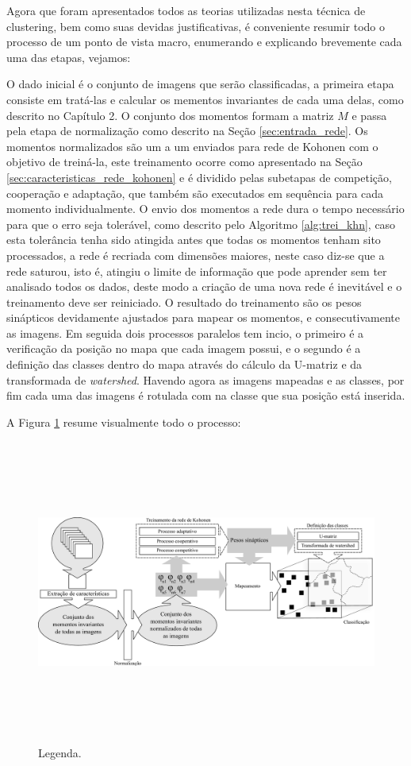 Agora que foram apresentados todos as teorias utilizadas nesta técnica de
clustering, bem como suas devidas justificativas, é conveniente resumir todo o
processo de um ponto de vista macro, enumerando e explicando brevemente cada uma
das etapas, vejamos:

O dado inicial é o conjunto de imagens que serão classificadas, a primeira etapa
consiste em tratá-las e calcular os mementos invariantes de cada uma delas, como
descrito no Capítulo 2. O conjunto dos momentos formam a matriz $ M $ e passa
pela etapa de normalização como descrito na Seção \ref{sec:entrada_rede}. Os
momentos normalizados são um a um enviados para rede de Kohonen com o objetivo
de treiná-la, este treinamento ocorre como apresentado na
Seção \ref{sec:caracteristicas_rede_kohonen} e é dividido pelas subetapas de
competição, cooperação e adaptação, que também são executados em sequência para
cada momento individualmente. O envio dos momentos a rede dura o tempo
necessário para que o erro seja tolerável, como descrito pelo
Algoritmo \ref{alg:trei_khn}, caso esta tolerância tenha sido atingida antes
que todas os momentos tenham sito processados, a rede é recriada com dimensões
maiores, neste caso diz-se que a rede saturou, isto é, atingiu o limite de
informação que pode aprender sem ter analisado todos os dados, deste modo a
criação de uma nova rede é inevitável e o treinamento deve ser reiniciado. O
resultado do treinamento são os pesos sinápticos devidamente ajustados para
mapear os momentos, e consecutivamente as imagens. Em seguida dois processos
paralelos tem incio, o primeiro é a verificação da posição no mapa que cada
imagem possui, e o segundo é a definição das classes dentro do mapa através do
cálculo da U-matriz e da transformada de \textit{watershed}. Havendo agora as
imagens mapeadas e as classes, por fim cada uma das imagens é rotulada com na
classe que sua posição está inserida.

A Figura \ref{fig:classificacao} resume visualmente todo o processo:

\begin{landscape}
  \begin{figure}[H]
    \begin{center}
      \includegraphics[height=10cm]{imagens/classificacao.pdf}
    \end{center}
    \caption{ Legenda. }
    \label{fig:classificacao}
  \end{figure}
\end{landscape}
